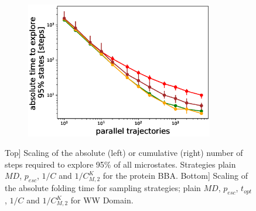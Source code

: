 \begin{figure}[H]
\begin{subfigure}[t]{0.5\textwidth}
    \includegraphics[width=0.9\textwidth]{figures/1FME_6_steps10000_scaling_explore.eps}   
  \end{subfigure}

  \caption{Top] Scaling of the
  absolute (left) or cumulative (right) number of steps required to explore
  95\% of all microstates. Strategies plain $MD$, $p_{esc}$, $1/C$ and $1/C_{M,2}^K$ for the protein BBA. 
  Bottom] Scaling of the absolute folding time for sampling strategies; plain
  $MD$, $p_{esc}$, $t_{opt}$, $1/C$ and $1/C_{M,2}^K$ for WW Domain.
  }
  \label{fig:scaling}
\end{figure}

